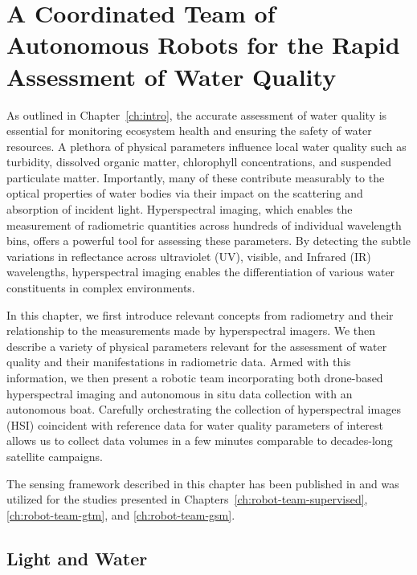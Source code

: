 \chapter{A Coordinated Team of Autonomous Robots for the Rapid Assessment of
  Water Quality}\label{ch:robot-team}

As outlined in Chapter~\ref{ch:intro}, the accurate assessment of water
quality is essential for monitoring ecosystem health and ensuring the safety of
water resources. A plethora of physical parameters
influence local water quality such as turbidity, dissolved organic matter, chlorophyll
concentrations, and suspended particulate matter. Importantly, many of these
contribute measurably to the optical properties of water bodies via
their impact on the scattering and absorption of incident light. Hyperspectral
imaging, which enables the measurement of radiometric quantities
across hundreds of individual wavelength bins, offers a powerful tool for
assessing these parameters. By detecting the subtle variations in
reflectance across ultraviolet (UV), visible, and Infrared (IR) wavelengths,
hyperspectral imaging enables the differentiation of various water constituents
in complex environments.

In this chapter, we first introduce relevant concepts from radiometry and their
relationship to the measurements made by hyperspectral imagers. We then
describe a variety of physical parameters relevant for the assessment of water
quality and their manifestations in radiometric data. Armed with this
information, we then present a robotic team incorporating both
drone-based hyperspectral imaging and autonomous in situ data collection with an
autonomous boat. Carefully orchestrating the collection of hyperspectral
images (HSI) coincident with reference data for water quality parameters of
interest allows us to collect data volumes in a few minutes comparable to
decades-long satellite campaigns.

The sensing framework described in this chapter has been published in
\cite{robot-team-1} and was utilized for the studies presented in
Chapters~\ref{ch:robot-team-supervised}, \ref{ch:robot-team-gtm}, and \ref{ch:robot-team-gsm}.


\section{Light and Water}\label{sec:imaging}

